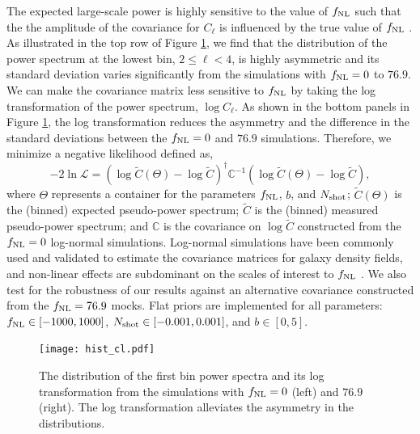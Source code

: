 The expected large-scale power is highly sensitive to the value of $f_{\rm NL}$ such that the the amplitude of the covariance for $C_{\ell}$ is influenced by the true value of $f_{\rm NL}$ \citep[see, e.g.,][for a discussion]{2013MNRAS.428.1116R}. As illustrated in the top row of Figure \ref{fig:histcell}, we find that the distribution of the power spectrum at the lowest bin, $2\leq \ell < 4$, is highly asymmetric and its standard deviation varies significantly from the simulations with $f_{\rm NL}=0$ to $76.9$. We can make the covariance matrix less sensitive to $f_{\rm NL}$ by taking the log transformation of the power spectrum, $\log C_{\ell}$. As shown in the bottom panels in Figure \ref{fig:histcell}, the log transformation reduces the asymmetry and the difference in the standard deviations between the $f_{\rm NL}=0$ and $76.9$ simulations. Therefore, we minimize a negative likelihood defined as,
\begin{equation}\label{eq:likelihood}
-2\ln\mathcal{L} = (\log \tilde{C}(\Theta)-\log \tilde{C})^{\dagger} \mathbb{C}^{-1} (\log \tilde{C}(\Theta)-\log \tilde{C}),
\end{equation}
where $\Theta$ represents a container for the parameters $f_{\rm NL}$, $b$, and $N_{\rm shot}$; $\tilde{C}(\Theta)$ is the (binned) expected pseudo-power spectrum; $\tilde{C}$ is the (binned) measured pseudo-power spectrum; and $\mathbb{C}$ is the covariance on $\log\tilde{C}$ constructed from the $f_{\rm NL}=0$ log-normal simulations. Log-normal simulations have been commonly used and validated to estimate the covariance matrices for galaxy density fields, and non-linear effects are subdominant on the scales of interest to $f_{\rm NL}$ \citep[see, e.g.,][]{2017MNRAS.466.1444C, 2021MNRAS.508.3125F}. We also test for the robustness of our results against an alternative covariance constructed from the $f_{\rm NL}=76.9$ mocks. Flat priors are implemented for all parameters: $f_{\rm NL} \in [-1000, 1000]$, $N_{\rm shot} \in [-0.001, 0.001]$, and $b \in [0, 5]$. %


\begin{figure}
\centering
\texttt{[image: hist\_cl.pdf]}
\caption{The distribution of the first bin power spectra and its log transformation from the simulations with $f_{\rm NL}=0$ (left) and $76.9$ (right). The log transformation alleviates the asymmetry in the distributions.}\label{fig:histcell}
\end{figure}




